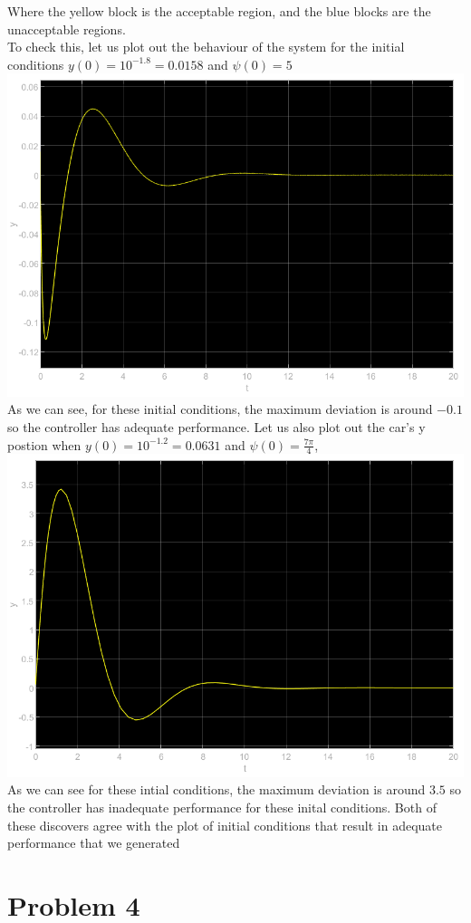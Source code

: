 \documentclass[12pt]{article}
\begin{document}
Where the yellow block is the acceptable region, and the blue blocks are the unacceptable regions.\\
To check this, let us plot out the behaviour of the system for the initial conditions $y(0)=10^{-1.8}=0.0158$ and $\psi(0)=5$\\
\includegraphics[scale=0.4]{Problem3Fig2.png}\\
As we can see, for these initial conditions, the maximum deviation is around $-0.1$ so the controller has adequate performance. Let us also plot out the car's y postion when
$y(0)=10^{-1.2}=0.0631$ and $\psi(0)=\frac{7\pi}{4}$,
\\\includegraphics[scale=0.4]{Problem3Fig3.png}\\
As we can see for these intial conditions, the maximum deviation is around $3.5$ so the controller has inadequate performance for these inital conditions. Both of these discovers agree with the plot of initial conditions
that result in adequate performance that we generated
\section*{Problem 4}
\end{document}
